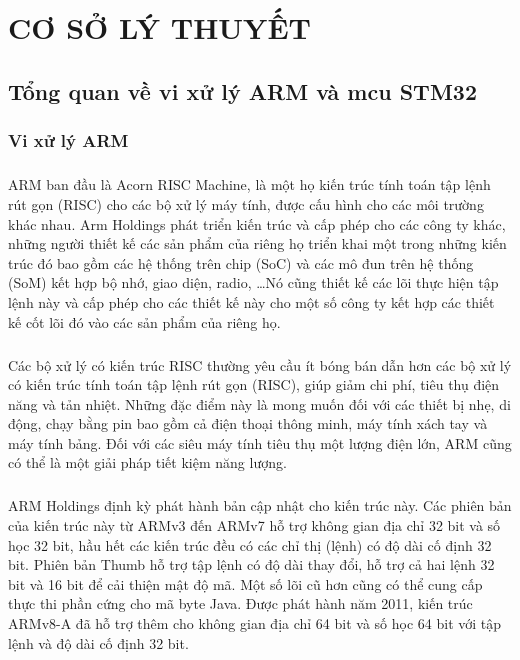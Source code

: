 \chapter{CƠ SỞ LÝ THUYẾT}
\section{Tổng quan về vi xử lý ARM và \acrfull{mcu} STM32}
\subsection{Vi xử lý ARM}
\paragraph{}
ARM ban đầu là Acorn RISC Machine, là một họ kiến trúc tính toán tập lệnh rút gọn (RISC) cho các bộ xử lý máy tính, được cấu hình cho các môi trường khác nhau. Arm Holdings phát triển kiến trúc và cấp phép cho các công ty khác, những người thiết kế các sản phẩm của riêng họ triển khai một trong những kiến trúc đó bao gồm các hệ thống trên chip (SoC) và các mô đun trên hệ thống (SoM) kết hợp bộ nhớ, giao diện, radio, …Nó cũng thiết kế các lõi thực hiện tập lệnh này và cấp phép cho các thiết kế này cho một số công ty kết hợp các thiết kế cốt lõi đó vào các sản phẩm của riêng họ.
\paragraph{}
Các bộ xử lý có kiến trúc RISC thường yêu cầu ít bóng bán dẫn hơn các bộ xử lý có kiến trúc tính toán tập lệnh rút gọn (RISC), giúp giảm chi phí, tiêu thụ điện năng và tản nhiệt. Những đặc điểm này là mong muốn đối với các thiết bị nhẹ, di động, chạy bằng pin bao gồm cả điện thoại thông minh, máy tính xách tay và máy tính bảng. Đối với các siêu máy tính tiêu thụ một lượng điện lớn, ARM cũng có thể là một giải pháp tiết kiệm năng lượng.
\paragraph{}
ARM Holdings định kỳ phát hành bản cập nhật cho kiến trúc này. Các phiên bản của kiến trúc này từ ARMv3 đến ARMv7 hỗ trợ không gian địa chỉ 32 bit và số học 32 bit, hầu hết các kiến trúc đều có các chỉ thị (lệnh) có độ dài cố định 32 bit. Phiên bản Thumb hỗ trợ tập lệnh có độ dài thay đổi, hỗ trợ cả hai lệnh 32 bit và 16 bit để cải thiện mật độ mã. Một số lõi cũ hơn cũng có thể cung cấp thực thi phần cứng cho mã byte Java. Được phát hành năm 2011, kiến trúc ARMv8-A đã hỗ trợ thêm cho không gian địa chỉ 64 bit và số học 64 bit với tập lệnh và độ dài cố định 32 bit.
